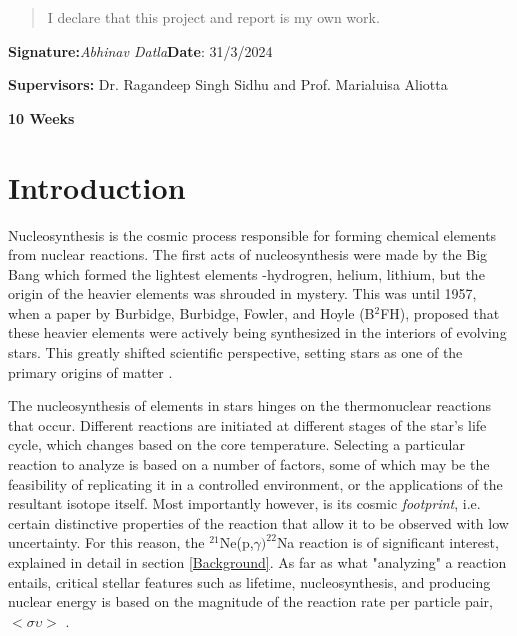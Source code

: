 \documentclass[a4paper,12pt]{article}
\begin{document}
\begin{quotation}
  I declare that this project and report is my own work.
\end{quotation}

\vspace*{2cm}
{\bf{Signature:}}\textit{Abhinav Datla}\hspace*{8cm}\textbf{Date}:  31/3/2024         %

\vfill
{\bf Supervisors:} Dr. Ragandeep Singh Sidhu and Prof. Marialuisa Aliotta                 %

\textbf{10 Weeks}                                         %
\newpage
%
\pagestyle{plain}                               %
\setcounter{page}{1}                            %
\tableofcontents{}  
\newpage


\section{Introduction}

Nucleosynthesis is the cosmic process responsible for forming chemical elements from nuclear reactions.  The first acts of nucleosynthesis were made by the Big Bang which formed the lightest elements -hydrogren, helium, lithium, but the origin of the heavier elements was shrouded in mystery.  This was until 1957, when a paper by Burbidge, Burbidge, Fowler, and Hoyle (B$^{2}$FH), proposed that these heavier elements were actively being synthesized in the interiors of evolving stars.  This greatly shifted scientific perspective, setting stars as one of the primary origins of matter \citealp{RolfsRodney1988}.  

The nucleosynthesis of elements in stars hinges on the thermonuclear reactions that occur.  Different reactions are initiated at different stages of the star's life cycle, which changes based on the core temperature.  Selecting a particular reaction to analyze is based on a number of factors, some of which may be the feasibility of replicating it in a controlled environment, or the applications of the resultant isotope itself.  Most importantly however, is its cosmic \textit{footprint}, i.e. certain distinctive properties of the reaction that allow it to be observed with low uncertainty.  For this reason, the $^{21}$Ne(p,$\gamma)^{22}$Na reaction is of significant interest, explained in detail in section \ref{Background}.  As far as what "analyzing" a reaction entails, critical stellar features such as lifetime, nucleosynthesis, and producing nuclear energy is based on the magnitude of the reaction rate per particle pair, $<\sigma\upsilon>$ \citealp{RolfsRodney1988}.
\end{document}
